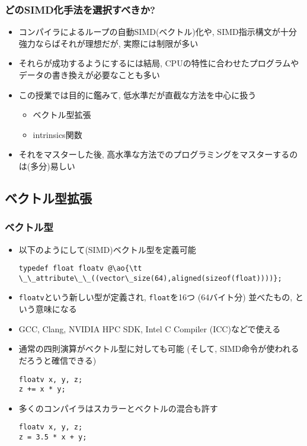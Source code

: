 \documentclass[10pt,dvipdfmx]{beamer}
\newcommand{\ao}[1]{{\color{blue}#1}}
\begin{document}
\begin{frame}
  \frametitle{どのSIMD化手法を選択すべきか?}
  \begin{itemize}
  \item コンパイラによるループの自動SIMD(ベクトル)化や,
    SIMD指示構文が十分強力ならばそれが理想だが,
    実際には制限が多い
  \item それらが成功するようにするには結局,
    CPUの特性に合わせたプログラムやデータの書き換えが必要なことも多い
  \item この授業では目的に鑑みて, 低水準だが直截な方法を中心に扱う
    \begin{itemize}
\item \ao{ベクトル型拡張}
\item \ao{intrinsics関数} 
    \end{itemize}
    
  \item それをマスターした後,
    高水準な方法でのプログラミングをマスターするのは(多分)易しい
  \end{itemize}
\end{frame}


\subsection{ベクトル型拡張}

\begin{frame}[fragile]
\frametitle{ベクトル型}
\begin{itemize}
\item 以下のようにして(SIMD)ベクトル型を定義可能
\begin{lstlisting}
typedef float floatv @\ao{\tt \_\_attribute\_\_((vector\_size(64),aligned(sizeof(float))))};
\end{lstlisting}

\item {\tt floatv}という新しい型が定義され, {\tt float}を16つ (64バイト分)
  並べたもの, という意味になる
  
\item GCC, Clang, NVIDIA HPC SDK, Intel C Compiler (ICC)などで使える

\item 通常の四則演算がベクトル型に対しても可能
  \ao{(そして, SIMD命令が使われるだろうと確信できる)}
\begin{lstlisting}
floatv x, y, z;
z += x * y;
\end{lstlisting}

\item 多くのコンパイラはスカラーとベクトルの混合も許す
\begin{lstlisting}
floatv x, y, z;
z = 3.5 * x + y;
\end{lstlisting}
\end{itemize}
\end{frame}
\end{document}
